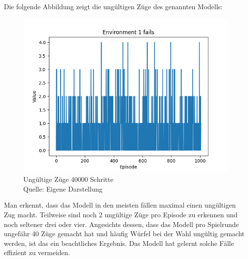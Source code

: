Die folgende Abbildung zeigt die ungültigen Züge des genannten Modells:
\nopagebreak
\begin{figure}[H]
	\includegraphics[width=1\textwidth]{Bilder/maskableppo_ganzschoenclever_193avg_v3.1f} 
	\caption[Ungültige Züge 40000 Schritte]{Ungültige Züge 40000 Schritte\\ Quelle: Eigene Darstellung}
\end{figure}

Man erkennt, dass das Modell in den meisten fällen maximal einen ungültigen Zug macht. Teilweise sind noch 2 ungültige Züge pro Episode zu erkennen und noch seltener drei oder vier. Angesichts dessen, dass das Modell pro Spielrunde ungefähr 40 Züge gemacht hat und häufig Würfel bei der Wahl ungültig gemacht werden, ist das ein beachtliches Ergebnis. Das Modell hat gelernt solche Fälle effizient zu vermeiden.\\


